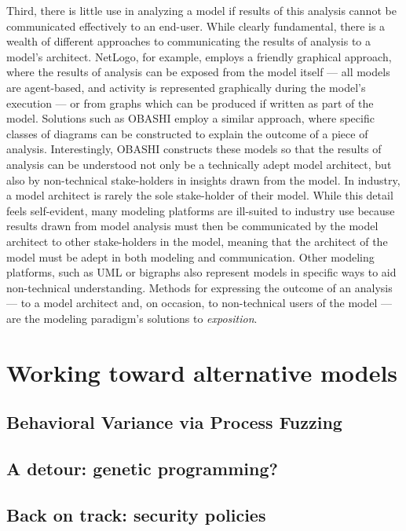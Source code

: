 \documentclass[draft,12pt]{article}
\begin{document}
Third, there is little use in analyzing a model if results of this analysis
cannot be communicated effectively to an end-user. While clearly fundamental,
there is a wealth of different approaches to communicating the results of
analysis to a model's architect. NetLogo\citep{tisue2004netlogo}, for example,
employs a friendly graphical approach, where the results of analysis can be
exposed from the model itself --- all models are agent-based, and activity is
represented graphically during the model's execution --- or from graphs which
can be produced if written as part of the model. Solutions such as
OBASHI\citep{obashimethodology} employ a similar approach, where specific
classes of diagrams can be constructed to explain the outcome of a piece of
analysis. Interestingly, OBASHI constructs these models so that the results of
analysis can be understood not only be a technically adept model architect, but
also by non-technical stake-holders in insights drawn from the model. In
industry, a model architect is rarely the sole stake-holder of their model.
While this detail feels self-evident, many modeling platforms are ill-suited to
industry use because results drawn from model analysis must then be communicated
by the model architect to other stake-holders in the model, meaning that the
architect of the model must be adept in both modeling and communication. Other
modeling platforms, such as UML\citep{rumbaugh2017unified} or
bigraphs\citep{milner2009space} also represent models in specific ways to aid
non-technical understanding.
Methods for expressing the outcome of an analysis
--- to a model architect and, on occasion, to non-technical users of the model
--- are the modeling paradigm's solutions to \emph{exposition}.\par


\section{Working toward alternative models}

\subsection{Behavioral Variance via Process Fuzzing}

\subsection{A detour: genetic programming?}

\subsection{Back on track: security policies}
\end{document}

